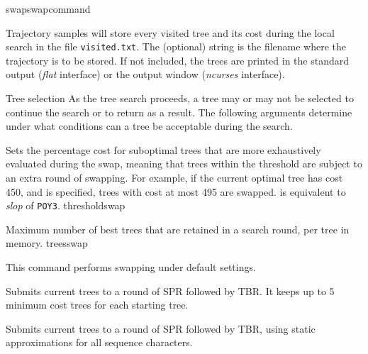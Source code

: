 \begin{command}{swap}{swapcommand}
\begin{arguments}
\begin{argumentgroup}{Trajectory samples}
{ will store every visited tree
and its cost during the local search in the file
\texttt{visited.txt}. The (optional) string is the filename where the
trajectory is to be stored. If not included, the trees are printed
in the standard output (\emph{flat} interface) or the output window (\emph{ncurses}
interface).}
{}

\end{argumentgroup}

\begin{argumentgroup}{Tree selection}
{As the tree search proceeds, a tree may or may not be selected to
continue the search or to return as a result. The following
arguments determine under what conditions can a tree be acceptable
during the search.}

{Sets the percentage cost for suboptimal
trees that are more exhaustively evaluated during the swap,
meaning that trees within the threshold are subject to an extra
round of swapping. For example, if the current
optimal tree has cost 450, and  is specified, trees
with cost at most 495 are swapped.  is
equivalent to \emph{slop} of \texttt{POY3}.}
{thresholdswap}

{Maximum number of best trees that are retained in a search round,
per tree in memory.}
{treesswap}

\end{argumentgroup}

\end{arguments}


\begin{poyexamples} 
{This command performs swapping under default settings.}

{Submits current trees to a round of SPR followed by TBR. It keeps
up to 5 minimum cost trees for each starting tree.}

{Submits current trees to a round of SPR followed by TBR, using
static approximations for all sequence characters.}


\end{poyexamples}
\end{command}
